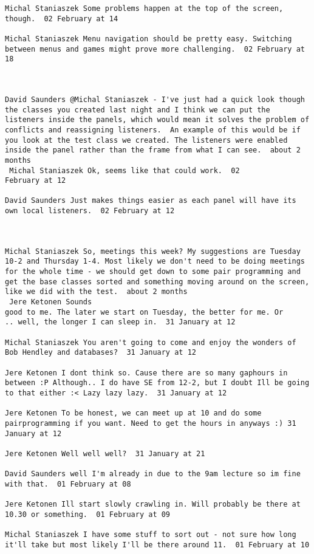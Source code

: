 \documentclass[10pt]{report}
\begin{document}
\begin{verbatim}
Michal Staniaszek Some problems happen at the top of the screen,
though.  02 February at 14

Michal Staniaszek Menu navigation should be pretty easy. Switching
between menus and games might prove more challenging.  02 February at
18



David Saunders @Michal Staniaszek - I've just had a quick look though
the classes you created last night and I think we can put the
listeners inside the panels, which would mean it solves the problem of
conflicts and reassigning listeners.  An example of this would be if
you look at the test class we created. The listeners were enabled
inside the panel rather than the frame from what I can see.  about 2
months 
 Michal Staniaszek Ok, seems like that could work.  02
February at 12

David Saunders Just makes things easier as each panel will have its
own local listeners.  02 February at 12



Michal Staniaszek So, meetings this week? My suggestions are Tuesday
10-2 and Thursday 1-4. Most likely we don't need to be doing meetings
for the whole time - we should get down to some pair programming and
get the base classes sorted and something moving around on the screen,
like we did with the test.  about 2 months 
 Jere Ketonen Sounds
good to me. The later we start on Tuesday, the better for me. Or
.. well, the longer I can sleep in.  31 January at 12

Michal Staniaszek You aren't going to come and enjoy the wonders of
Bob Hendley and databases?  31 January at 12

Jere Ketonen I dont think so. Cause there are so many gaphours in
between :P Although.. I do have SE from 12-2, but I doubt Ill be going
to that either :< Lazy lazy lazy.  31 January at 12

Jere Ketonen To be honest, we can meet up at 10 and do some
pairprogramming if you want. Need to get the hours in anyways :) 31
January at 12

Jere Ketonen Well well well?  31 January at 21

David Saunders well I'm already in due to the 9am lecture so im fine
with that.  01 February at 08

Jere Ketonen Ill start slowly crawling in. Will probably be there at
10.30 or something.  01 February at 09

Michal Staniaszek I have some stuff to sort out - not sure how long
it'll take but most likely I'll be there around 11.  01 February at 10


\end{verbatim}
\end{document}
